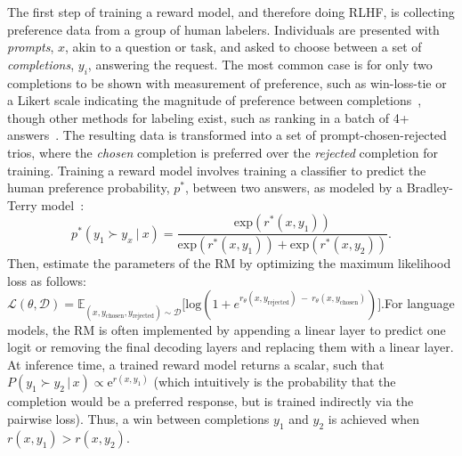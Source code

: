 The first step of training a reward model, and therefore doing RLHF, is collecting preference data from a group of human labelers.
Individuals are presented with \textit{prompts}, $x$, akin to a question or task, and asked to choose between a set of \textit{completions}, $y_i$, answering the request.
The most common case is for only two completions to be shown with measurement of preference, such as win-loss-tie or a Likert scale indicating the magnitude of preference between completions~\citep{bai2022training}, though other methods for labeling exist, such as ranking in a batch of 4+ answers~\citep{ouyang2022training}.
The resulting data is transformed into a set of prompt-chosen-rejected trios, where the \textit{chosen} completion is preferred over the \textit{rejected} completion for training. 
Training a reward model involves training a classifier to predict the human preference probability, $p^*$, between two answers, as modeled by a Bradley-Terry model~\citep{BradleyTerry}:
\begin{equation}
    p^*(y_{1} \succ y_x \ | \ x) = \frac{\text{exp}(r^*(x, y_1))}{\text{exp}(r^*(x, y_1)) + \text{exp}(r^*(x, y_2))}.
\end{equation}
Then, estimate the parameters of the RM by optimizing the maximum likelihood loss as follows: %
$
\mathcal{L}(\theta, \mathcal{D}) = \mathbb{E}_{(x,y_\text{chosen}, y_\text{rejected}) \sim \mathcal{D}} \big[ \text{log}( 1+e^{r_\theta(x, y_\text{rejected}) \ - \ r_\theta(x, y_\text{chosen})} ) \big].
$For language models, the RM is often implemented by appending a linear layer to predict one logit or removing the final decoding layers and replacing them with a linear layer.
At inference time, a trained reward model returns a scalar, such that $P(y_1 \succ y_2 \,|\, x) \propto  \text{e}^{r(x,y_1)}$ (which intuitively is the probability that the completion would be a preferred response, but is trained indirectly via the pairwise loss).
Thus, a win between completions $y_1$ and $y_2$ is achieved when $r(x,y_1) > r(x,y_2)$.

